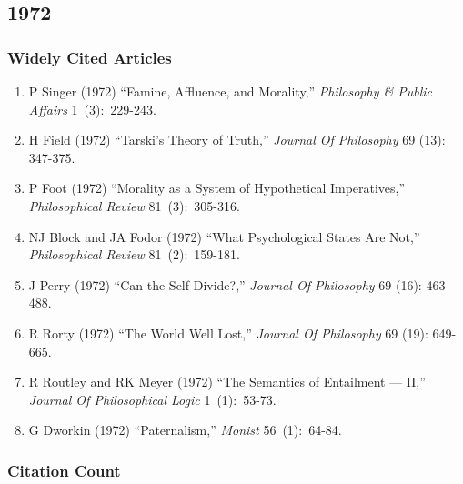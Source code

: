 \documentclass[
  10pt,
  letterpaper,
  DIV=11,
  numbers=noendperiod,
  twoside]{scrartcl}
\providecommand{\tightlist}{%
  \setlength{\itemsep}{0pt}\setlength{\parskip}{0pt}}\usepackage{longtable,booktabs,array}
\begin{document}
\newpage

\subsection{1972}\label{sec-s1972}

\subsubsection*{Widely Cited Articles}\label{widely-cited-articles-15}

\begin{enumerate}
\def\labelenumi{\arabic{enumi}.}
\tightlist
\item
  P Singer (1972) ``Famine, Affluence, and Morality,'' \emph{Philosophy
  \& Public Affairs} 1~(3):~229-243.
\item
  H Field (1972) ``Tarski's Theory of Truth,'' \emph{Journal Of
  Philosophy} 69 (13): 347-375.
\item
  P Foot (1972) ``Morality as a System of Hypothetical Imperatives,''
  \emph{Philosophical Review} 81~(3):~305-316.
\item
  NJ Block and JA Fodor (1972) ``What Psychological States Are Not,''
  \emph{Philosophical Review} 81~(2):~159-181.
\item
  J Perry (1972) ``Can the Self Divide?,'' \emph{Journal Of Philosophy}
  69 (16): 463-488.
\item
  R Rorty (1972) ``The World Well Lost,'' \emph{Journal Of Philosophy}
  69 (19): 649-665.
\item
  R Routley and RK Meyer (1972) ``The Semantics of Entailment --- II,''
  \emph{Journal Of Philosophical Logic} 1~(1):~53-73.
\item
  G Dworkin (1972) ``Paternalism,'' \emph{Monist} 56~(1):~64-84.
\end{enumerate}

\subsubsection*{Citation Count}\label{sec-count-1972}
\end{document}
